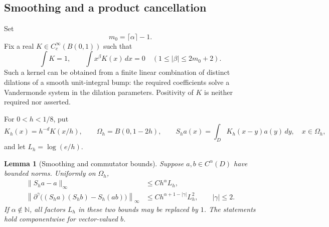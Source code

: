 \documentclass[11pt]{article}
\newtheorem{lemma}[theorem]{Lemma}
\theoremstyle{remark}
\begin{document}
\subsection{Smoothing and a product cancellation}

Set
\[
m_0=\lceil\alpha\rceil-1.
\]
Fix a real \(K\in C^\infty_c(B(0,1))\) such that
\begin{equation}\label{eq:kernel}
\int K=1,\qquad
\int x^\beta K(x)\,dx=0
\quad(1\leq|\beta|\leq2m_0+2).
\end{equation}
Such a kernel can be obtained from a finite linear combination of
distinct dilations of a smooth unit-integral bump: the required
coefficients solve a Vandermonde system in the dilation parameters.
Positivity of \(K\) is neither required nor asserted.

For \(0<h<1/8\), put
\[
K_h(x)=h^{-d}K(x/h),\qquad
\Omega_h=B(0,1-2h),\qquad
S_h a(x)=\int_D K_h(x-y)a(y)\,dy,\quad x\in\Omega_h,
\]
and let \(L_h=\log(e/h)\).

\begin{lemma}[Smoothing and commutator bounds]\label{lem:commutator}
Suppose \(a,b\in C^\alpha(D)\) have bounded norms. Uniformly on
\(\Omega_h\),
\begin{align}
\|S_h a-a\|_\infty&\leq C h^\alpha L_h,
\label{eq:smoothing}\\
\left\|\partial^\gamma
\big((S_h a)(S_h b)-S_h(ab)\big)\right\|_\infty
&\leq C h^{\alpha+1-|\gamma|}L_h^2,
\qquad |\gamma|\leq2.
\label{eq:commutator}
\end{align}
If \(\alpha\notin\mathbb N\), all factors \(L_h\) in these two
bounds may be replaced by \(1\). The statements hold componentwise
for vector-valued \(b\).
\end{lemma}
\end{document}
